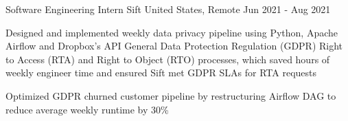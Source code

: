   \cventry
    {Software Engineering Intern} %
    {Sift} %
    {United States, Remote} %
    {Jun 2021 - Aug 2021} %
    {
      \begin{cvitems} %
        \item {Designed and implemented weekly data privacy pipeline using Python, Apache Airflow and Dropbox's API General Data Protection Regulation (GDPR) Right to Access (RTA) and Right to Object (RTO) processes, which saved hours of weekly engineer time and ensured Sift met GDPR SLAs for RTA requests}
        \item {Optimized GDPR churned customer pipeline by restructuring Airflow DAG to reduce average weekly runtime by 30\%}
      \end{cvitems}
    }
